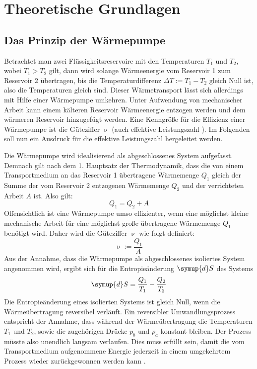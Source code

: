 \section{Theoretische Grundlagen}
\label{sec:Theorie}

\subsection{Das Prinzip der Wärmepumpe}
Betrachtet man zwei Flüssigkeitsreservoire mit den Temperaturen $T_1$ und $T_2$, wobei $T_1 > T_2$ gilt, dann wird solange Wärmeenergie vom Reservoir 1 zum Reservoir 2 übertragen, bis die Temperaturdifferenz $\Delta T := T_1 - T_2$ gleich Null ist, also die Temperaturen gleich sind.
Dieser Wärmetransport lässt sich allerdings mit Hilfe einer Wärmepumpe umkehren. Unter Aufwendung von mechanischer Arbeit kann einem kälteren Reservoir Wärmeenergie entzogen werden und dem wärmeren Reservoir hinzugefügt werden.
Eine Kenngröße für die Effizienz einer Wärmepumpe ist die Güteziffer $\upnu$ (auch effektive Leistungszahl \cite{geschke}). Im Folgenden soll nun ein Ausdruck für die effektive Leistungszahl hergeleitet werden.

Die Wärmepumpe wird idealisierend als abgeschlossenes System aufgefasst.
Demnach gilt nach dem 1. Hauptsatz der Thermodynamik, dass die von einem Transportmedium an das Reservoir 1 übertragene Wärmemenge $Q_1$ gleich der Summe der vom Reservoir 2 entzogenen Wärmemenge $Q_2$ und der verrichteten Arbeit $A$ ist. Also gilt:
\begin{equation}
	\label{eqn:dQ}
	Q_1 = Q_2 + A
\end{equation}
Offensichtlich ist eine Wärmepumpe umso effizienter, wenn eine möglichst kleine mechanische Arbeit für eine möglichst große übertragene Wärmemenge $Q_1$ benötigt wird. Daher wird die Güteziffer $\upnu$ wie folgt definiert:
\begin{equation}
	\label{eqn:guete}
	\upnu := \frac{Q_1}{A}
\end{equation}
Aus der Annahme, dass die Wärmepumpe als abgeschlossenes isoliertes System angenommen wird, ergibt sich für die Entropieänderung $\symup{d}S$ des Systems
\begin{equation}
	\label{eqn:entropie}
	\symup{d}S = \frac{Q_1}{T_1} - \frac{Q_2}{T_2}
\end{equation}
Die Entropieänderung eines isolierten Systems ist gleich Null, wenn die Wärmeübertragung reversibel verläuft.
Ein reversibler Umwandlungsprozess entspricht der Annahme, dass während der Wärmeübertragung die Temperaturen $T_1$ und $T_2$, sowie die zugehörigen Drücke $p_b$ und $p_a$ konstant bleiben. Der Prozess müsste also unendlich langsam verlaufen.
Dies muss erfüllt sein, damit die vom Transportmedium aufgenommene Energie jederzeit in einem umgekehrtem Prozess wieder zurückgewonnen werden kann \cite{Anleitung}.

